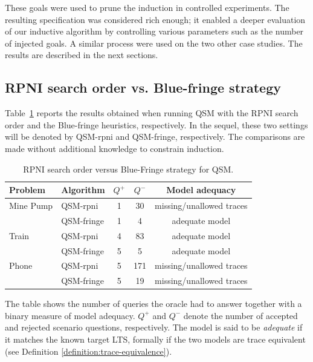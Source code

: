 These goals were used to prune the induction in controlled experiments. The resulting specification was considered rich enough; it enabled a deeper evaluation of our inductive algorithm by controlling various parameters such as the number of injected goals. A similar process were used on the two other case studies. The results are described in the next sections.


\subsection{RPNI search order vs. Blue-fringe strategy\label{subsection:evaluation-bluefringe-on-casestudies}}

Table~\ref{RPNI:Blue-fringe} reports the results obtained when running QSM with the RPNI search order and the Blue-fringe heuristics, respectively. In the sequel, these two settings will be denoted by QSM-rpni and QSM-fringe, respectively. The comparisons are made without additional knowledge to constrain induction. 

\begin{table}[H]
\centering
\begin{tabular}{|l||l||c|c|c|}\hline
Problem   & Algorithm   &$Q^+$&$Q^-$& Model adequacy\\\hline\hline
Mine Pump & QSM-rpni    & 1   & 30  & missing/unallowed traces\\\cline{2-5}
          & QSM-fringe  & 1   & 4   & adequate model\\\hline
Train     & QSM-rpni    & 4   & 83  & adequate model\\\cline{2-5}
          & QSM-fringe  & 5   & 5   & adequate model\\\hline
Phone     & QSM-rpni    & 5   & 171 & missing/unallowed traces\\\cline{2-5}
          & QSM-fringe  & 5   & 19  & missing/unallowed traces\\\hline
\end{tabular}
\caption{RPNI search order versus Blue-Fringe strategy for QSM.\label{RPNI:Blue-fringe}}
\end{table}

The table shows the number of queries the oracle had to answer together with a binary measure of model adequacy. $Q^+$ and $Q^-$ denote the number of accepted and rejected scenario questions, respectively. The model is said to be \emph{adequate} if it matches the known target LTS, formally if the two models are trace equivalent (see Definition \ref{definition:trace-equivalence}). 


